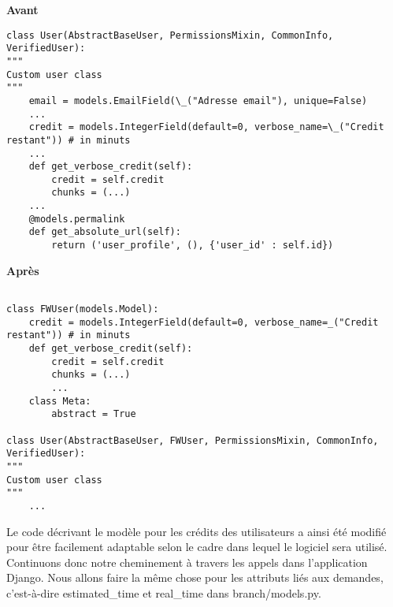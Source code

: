 \begin{minipage}{.5\textwidth}
\begin{center} \textbf{Avant}\end{center}
\begin{lstlisting}
class User(AbstractBaseUser, PermissionsMixin, CommonInfo, VerifiedUser):
"""
Custom user class
"""
	email = models.EmailField(\_("Adresse email"), unique=False)
	...
	credit = models.IntegerField(default=0, verbose_name=\_("Credit restant")) # in minuts
	...
	def get_verbose_credit(self):
		credit = self.credit
		chunks = (...)
	...
	@models.permalink
	def get_absolute_url(self):
		return ('user_profile', (), {'user_id' : self.id})
\end{lstlisting} 
\end{minipage}
\hspace{0.3cm}
\begin{minipage}{.5\textwidth}
\begin{center} \textbf{Après}\end{center}
\begin{lstlisting}

class FWUser(models.Model):
    credit = models.IntegerField(default=0, verbose_name=_("Credit restant")) # in minuts   
    def get_verbose_credit(self):
        credit = self.credit
        chunks = (...)
        ...
    class Meta:
        abstract = True

class User(AbstractBaseUser, FWUser, PermissionsMixin, CommonInfo, VerifiedUser):
"""
Custom user class
"""
	...
\end{lstlisting} 
\end{minipage}


Le code décrivant le modèle pour les crédits des utilisateurs a ainsi été modifié pour être facilement adaptable selon le cadre dans lequel le logiciel sera utilisé.  Continuons donc notre cheminement à travers les appels dans l'application Django.  Nous allons faire la même chose pour les attributs liés aux demandes,  c'est-à-dire estimated\_time et real\_time dans branch/models.py.  

